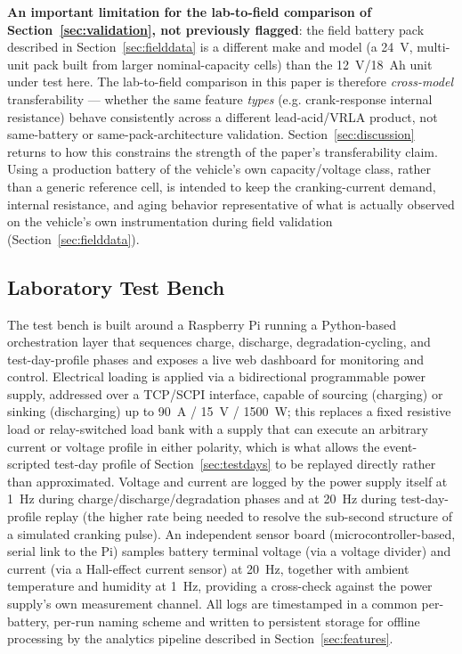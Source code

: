 \documentclass[conference]{IEEEtran}
\begin{document}
\textbf{An important limitation for the lab-to-field comparison of Section~\ref{sec:validation}, not previously flagged}: the field battery pack described in Section~\ref{sec:fielddata} is a different make and model (a 24~V, multi-unit pack built from larger nominal-capacity cells) than the 12~V/18~Ah unit under test here. The lab-to-field comparison in this paper is therefore \emph{cross-model} transferability --- whether the same feature \emph{types} (e.g. crank-response internal resistance) behave consistently across a different lead-acid/VRLA product, not same-battery or same-pack-architecture validation. Section~\ref{sec:discussion} returns to how this constrains the strength of the paper's transferability claim. Using a production battery of the vehicle's own capacity/voltage class, rather than a generic reference cell, is intended to keep the cranking-current demand, internal resistance, and aging behavior representative of what is actually observed on the vehicle's own instrumentation during field validation (Section~\ref{sec:fielddata}).

\subsection{Laboratory Test Bench}
\label{sec:testbench}

The test bench is built around a Raspberry Pi running a Python-based orchestration layer that sequences charge, discharge, degradation-cycling, and test-day-profile phases and exposes a live web dashboard for monitoring and control. Electrical loading is applied via a bidirectional programmable power supply, addressed over a TCP/SCPI interface, capable of sourcing (charging) or sinking (discharging) up to 90~A / 15~V / 1500~W; this replaces a fixed resistive load or relay-switched load bank with a supply that can execute an arbitrary current or voltage profile in either polarity, which is what allows the event-scripted test-day profile of Section~\ref{sec:testdays} to be replayed directly rather than approximated. Voltage and current are logged by the power supply itself at 1~Hz during charge/discharge/degradation phases and at 20~Hz during test-day-profile replay (the higher rate being needed to resolve the sub-second structure of a simulated cranking pulse). An independent sensor board (microcontroller-based, serial link to the Pi) samples battery terminal voltage (via a voltage divider) and current (via a Hall-effect current sensor) at 20~Hz, together with ambient temperature and humidity at 1~Hz, providing a cross-check against the power supply's own measurement channel. All logs are timestamped in a common per-battery, per-run naming scheme and written to persistent storage for offline processing by the analytics pipeline described in Section~\ref{sec:features}.
\end{document}
